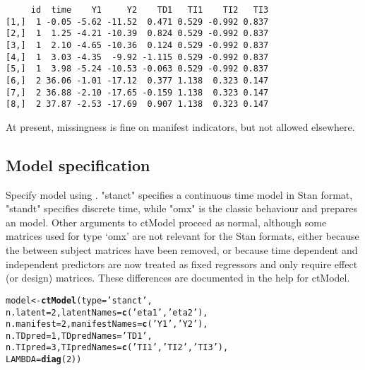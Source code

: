 \documentclass[nojss]{jss}\usepackage[]{graphicx}\usepackage[]{color}
\makeatletter
\newcommand{\hlnum}[1]{\textcolor[rgb]{0.686,0.059,0.569}{#1}}%
\newcommand{\hlstr}[1]{\textcolor[rgb]{0.192,0.494,0.8}{#1}}%
\newcommand{\hlstd}[1]{\textcolor[rgb]{0.345,0.345,0.345}{#1}}%
\newcommand{\hlkwb}[1]{\textcolor[rgb]{0.69,0.353,0.396}{#1}}%
\newcommand{\hlkwc}[1]{\textcolor[rgb]{0.333,0.667,0.333}{#1}}%
\newcommand{\hlkwd}[1]{\textcolor[rgb]{0.737,0.353,0.396}{\textbf{#1}}}%
\newenvironment{kframe}{%
 \def\at@end@of@kframe{}%
 \ifinner\ifhmode%
  \def\at@end@of@kframe{\end{minipage}}%
  \begin{minipage}{\columnwidth}%
 \fi\fi%
 \def\FrameCommand##1{\hskip\@totalleftmargin \hskip-\fboxsep
 \colorbox{shadecolor}{##1}\hskip-\fboxsep
     \hskip-\linewidth \hskip-\@totalleftmargin \hskip\columnwidth}%
 \MakeFramed {\advance\hsize-\width
   \@totalleftmargin\z@ \linewidth\hsize
   \@setminipage}}%
 {\par\unskip\endMakeFramed%
 \at@end@of@kframe}
\newenvironment{knitrout}{}{} %
\makeatother
\begin{document}
\begin{knitrout}\footnotesize
{}\color{fgcolor}\begin{kframe}
\begin{verbatim}
     id  time    Y1     Y2    TD1   TI1    TI2   TI3
[1,]  1 -0.05 -5.62 -11.52  0.471 0.529 -0.992 0.837
[2,]  1  1.25 -4.21 -10.39  0.824 0.529 -0.992 0.837
[3,]  1  2.10 -4.65 -10.36  0.124 0.529 -0.992 0.837
[4,]  1  3.03 -4.35  -9.92 -1.115 0.529 -0.992 0.837
[5,]  1  3.98 -5.24 -10.53 -0.063 0.529 -0.992 0.837
[6,]  2 36.06 -1.01 -17.12  0.377 1.138  0.323 0.147
[7,]  2 36.88 -2.10 -17.65 -0.159 1.138  0.323 0.147
[8,]  2 37.87 -2.53 -17.69  0.907 1.138  0.323 0.147
\end{verbatim}
\end{kframe}
\end{knitrout}

At present, missingness is fine on manifest indicators, but not allowed elsewhere.

\subsection{Model specification}
Specify model using . "stanct" specifies a continuous time model in Stan format, "standt" specifies discrete time, while "omx" is the classic  behaviour and prepares an  model. Other arguments to ctModel proceed as normal, although some matrices used for type `omx' are not relevant for the Stan formats, either because the between subject matrices have been removed, or because time dependent and independent predictors are now treated as fixed regressors and only require effect (or design) matrices. These differences are documented in the help for ctModel.

\begin{knitrout}\small
{}\color{fgcolor}\begin{kframe}
\begin{alltt}
\hlstd{model}\hlkwb{<-}\hlkwd{ctModel}\hlstd{(}\hlkwc{type}\hlstd{=}\hlstr{'stanct'}\hlstd{,}
  \hlkwc{n.latent}\hlstd{=}\hlnum{2}\hlstd{,} \hlkwc{latentNames}\hlstd{=}\hlkwd{c}\hlstd{(}\hlstr{'eta1'}\hlstd{,}\hlstr{'eta2'}\hlstd{),}
  \hlkwc{n.manifest}\hlstd{=}\hlnum{2}\hlstd{,} \hlkwc{manifestNames}\hlstd{=}\hlkwd{c}\hlstd{(}\hlstr{'Y1'}\hlstd{,}\hlstr{'Y2'}\hlstd{),}
  \hlkwc{n.TDpred}\hlstd{=}\hlnum{1}\hlstd{,} \hlkwc{TDpredNames}\hlstd{=}\hlstr{'TD1'}\hlstd{,}
  \hlkwc{n.TIpred}\hlstd{=}\hlnum{3}\hlstd{,} \hlkwc{TIpredNames}\hlstd{=}\hlkwd{c}\hlstd{(}\hlstr{'TI1'}\hlstd{,}\hlstr{'TI2'}\hlstd{,}\hlstr{'TI3'}\hlstd{),}
  \hlkwc{LAMBDA}\hlstd{=}\hlkwd{diag}\hlstd{(}\hlnum{2}\hlstd{))}
\end{alltt}
\end{kframe}
\end{knitrout}
\end{document}
